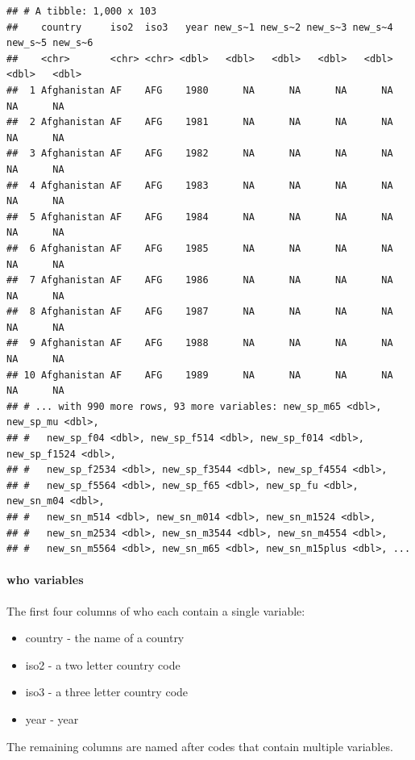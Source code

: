 \documentclass[
]{article}
\providecommand{\tightlist}{%
  \setlength{\itemsep}{0pt}\setlength{\parskip}{0pt}}
\begin{document}
\begin{verbatim}
## # A tibble: 1,000 x 103
##    country     iso2  iso3   year new_s~1 new_s~2 new_s~3 new_s~4 new_s~5 new_s~6
##    <chr>       <chr> <chr> <dbl>   <dbl>   <dbl>   <dbl>   <dbl>   <dbl>   <dbl>
##  1 Afghanistan AF    AFG    1980      NA      NA      NA      NA      NA      NA
##  2 Afghanistan AF    AFG    1981      NA      NA      NA      NA      NA      NA
##  3 Afghanistan AF    AFG    1982      NA      NA      NA      NA      NA      NA
##  4 Afghanistan AF    AFG    1983      NA      NA      NA      NA      NA      NA
##  5 Afghanistan AF    AFG    1984      NA      NA      NA      NA      NA      NA
##  6 Afghanistan AF    AFG    1985      NA      NA      NA      NA      NA      NA
##  7 Afghanistan AF    AFG    1986      NA      NA      NA      NA      NA      NA
##  8 Afghanistan AF    AFG    1987      NA      NA      NA      NA      NA      NA
##  9 Afghanistan AF    AFG    1988      NA      NA      NA      NA      NA      NA
## 10 Afghanistan AF    AFG    1989      NA      NA      NA      NA      NA      NA
## # ... with 990 more rows, 93 more variables: new_sp_m65 <dbl>, new_sp_mu <dbl>,
## #   new_sp_f04 <dbl>, new_sp_f514 <dbl>, new_sp_f014 <dbl>, new_sp_f1524 <dbl>,
## #   new_sp_f2534 <dbl>, new_sp_f3544 <dbl>, new_sp_f4554 <dbl>,
## #   new_sp_f5564 <dbl>, new_sp_f65 <dbl>, new_sp_fu <dbl>, new_sn_m04 <dbl>,
## #   new_sn_m514 <dbl>, new_sn_m014 <dbl>, new_sn_m1524 <dbl>,
## #   new_sn_m2534 <dbl>, new_sn_m3544 <dbl>, new_sn_m4554 <dbl>,
## #   new_sn_m5564 <dbl>, new_sn_m65 <dbl>, new_sn_m15plus <dbl>, ...
\end{verbatim}

\hypertarget{who-variables}{%
\paragraph{who variables}\label{who-variables}}

The first four columns of who each contain a single variable:

\begin{itemize}
\tightlist
\item
  country - the name of a country
\item
  iso2 - a two letter country code
\item
  iso3 - a three letter country code
\item
  year - year
\end{itemize}

The remaining columns are named after codes that contain multiple
variables.
\end{document}
